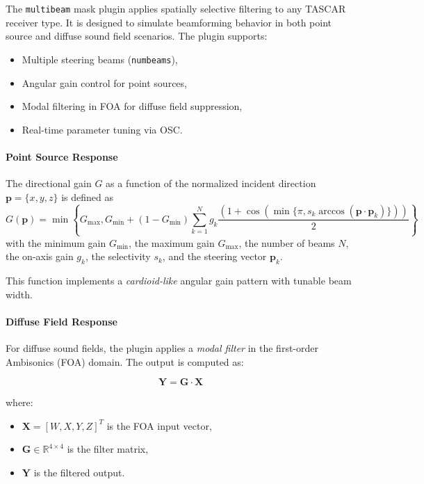 The \texttt{multibeam} mask plugin applies spatially selective filtering to any TASCAR receiver type. It is designed to simulate beamforming behavior in both point source and diffuse sound field scenarios. The plugin supports:
\begin{itemize}
  \item Multiple steering beams (\texttt{numbeams}),
  \item Angular gain control for point sources,
  \item Modal filtering in FOA for diffuse field suppression,
  \item Real-time parameter tuning via OSC.
\end{itemize}


\paragraph{Point Source Response}

The directional gain $G$ as a function of the normalized incident direction
$\mathbf{p} = \{x,y,z\}$ is defined as
%
\begin{equation}
G(\mathbf{p}) = \min{\left\{G_{\textrm{max}},G_{\textrm{min}} + (1-G_{\textrm{min}})\sum\limits_{k=1}^N g_k\frac{\left(1+\cos\left(\min\{\pi,s_k \arccos\left(\mathbf{p}\cdot\mathbf{p}_k\right)\}\right)\right)}{2}\right\}}
\end{equation}
%
with the minimum gain $G_\textrm{min}$, the maximum gain
$G_\textrm{max}$, the number of beams $N$, the on-axis gain $g_k$, the
selectivity $s_k$, and the steering vector $\mathbf{p}_k$.

This function implements a {\em cardioid-like} angular gain pattern with tunable beam width.

\paragraph{Diffuse Field Response}

For diffuse sound fields, the plugin applies a {\em modal filter} in the first-order Ambisonics (FOA) domain. The output is computed as:

\begin{equation}
\mathbf{Y} = \mathbf{G} \cdot \mathbf{X}
\end{equation}

where:
\begin{itemize}
  \item $\mathbf{X} = [W, X, Y, Z]^T$ is the FOA input vector,
  \item $\mathbf{G} \in \mathbb{R}^{4 \times 4}$ is the filter matrix,
  \item $\mathbf{Y}$ is the filtered output.
\end{itemize}

